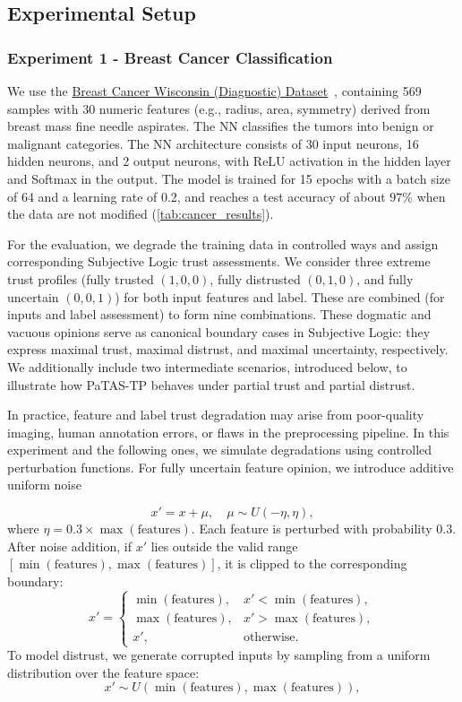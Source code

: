 \subsection{Experimental Setup }
\subsubsection{Experiment 1 - Breast Cancer Classification}\label{exp:1}
We use the \href{https://archive.ics.uci.edu/dataset/17/breast+cancer+wisconsin+diagnostic}{Breast Cancer Wisconsin (Diagnostic) Dataset}~\cite{breastcancer-wisconsin}, containing 569 samples with 30 numeric features (e.g., radius, area, symmetry) derived from breast mass fine needle aspirates. The \ac{NN} classifies the tumors into benign or malignant categories.
The \ac{NN} architecture consists of 30 input neurons, 16 hidden neurons, and 2 output neurons, with ReLU activation in the hidden layer and Softmax in the output. The model is trained for 15 epochs with a batch size of 64 and a learning rate of 0.2, and reaches a test accuracy of about $97\%$ when the data are not modified (\cref{tab:cancer_results}).

For the evaluation, we degrade the training data in controlled ways and assign corresponding Subjective Logic trust assessments. We consider three extreme trust profiles (fully trusted \((1,0,0)\), fully distrusted \((0,1,0)\), and fully uncertain \((0,0,1)\)) for both input features and label. These are combined (for inputs and label assessment) to form nine combinations. These dogmatic and vacuous opinions serve as canonical boundary cases in Subjective Logic: they express maximal trust, maximal distrust, and maximal uncertainty, respectively. We additionally include two intermediate scenarios, introduced below, to illustrate how \ac{PaTAS-TP} behaves under partial trust and partial distrust.

In practice, feature and label trust degradation may arise from poor-quality imaging, human annotation errors, or flaws in the preprocessing pipeline. In this experiment and the following ones, we simulate degradations using controlled perturbation functions. For fully uncertain feature opinion, we introduce additive uniform noise 

\[
x' = x + \mu, \quad \mu \sim U(-\eta, \eta),
\]
where 
\(
\eta = 0.3 \times \max(\text{features}).
\)
Each feature is perturbed with probability $0.3$. 
After noise addition, if $x'$ lies outside the valid range 
$[\min(\text{features}), \max(\text{features})]$, it is clipped to the corresponding boundary:
\[
x' = 
\begin{cases}
\min(\text{features}), & x' < \min(\text{features}), \\
\max(\text{features}), & x' > \max(\text{features}), \\
x', & \text{otherwise}.
\end{cases}
\]
To model distrust, we generate corrupted inputs by sampling from a uniform distribution over the feature space:
\[
x' \sim U\left(\min\left(\text{features}\right), \max\left(\text{features}\right)\right),
\]
 
